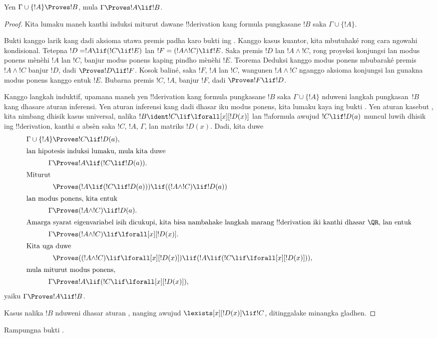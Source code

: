 \documentclass[../../../include/open-logic-section]{subfiles}
\begin{document}


\begin{thm}
 Yen $\Gamma \cup \{!A\} \Proves !B$,
mula $\Gamma \Proves !A \lif !B$.
\end{thm}

\begin{proof}
Kita lumaku maneh kanthi induksi miturut dawane !!{derivation} kang
formula pungkasane $!B$ saka $\Gamma \cup \{!A\}$.

Bukti kanggo larik kang dadi aksioma utawa premis padha karo bukti
ing . Kanggo kasus kuantor, kita
mbutuhaké rong cara ngowahi kondisional. Tetepna
$!D = !A\lif(!C\lif !E)$ lan $!F = (!A\land !C)\lif !E$.
Saka premis $!D$ lan $!A\land !C$, rong proyeksi
konjungsi lan modus ponens mènèhi $!A$ lan $!C$, banjur modus ponens
kaping pindho mènèhi $!E$. Teorema Deduksi kanggo modus ponens
mbubaraké premis $!A\land !C$ banjur $!D$, dadi $\Proves !D\lif !F$.
Kosok baliné, saka $!F$, $!A$ lan $!C$, wangunen $!A\land !C$ nganggo
aksioma konjungsi lan gunakna modus ponens kanggo entuk $!E$.
Bubarna premis $!C$, $!A$, banjur $!F$, dadi $\Proves !F\lif !D$.

Kanggo langkah induktif, upamana maneh yen !!{derivation} kang formula
pungkasane $!B$ saka $\Gamma \cup \{!A\}$ nduweni langkah
pungkasan~$!B$ kang dhasare aturan inferensi. Yen aturan inferensi
kang dadi dhasar iku modus ponens, kita lumaku kaya ing bukti
. Yen aturan kasebut \QR, kita
nimbang dhisik kasus universal, nalika $!B \ident !C \lif \lforall[x][!D(x)]$ lan !!a{formula}
awujud $!C \lif !D(a)$ muncul luwih dhisik ing !!{derivation}, kanthi
$a$ absèn saka $!C$, $!A$, $\Gamma$, lan matriks $!D(x)$. Dadi, kita duwe
\begin{align*}
  \Gamma \cup \{!A\} & \Proves !C \lif !D(a),\\
  \intertext{lan hipotesis induksi lumaku, mula kita duwe}
    \Gamma & \Proves !A \lif (!C \lif !D(a)).\\
  \intertext{Miturut}
  & \Proves (!A \lif (!C \lif !D(a))) \lif ((!A \land !C) \lif !D(a))\\
  \intertext{lan modus ponens, kita entuk}
  \Gamma & \Proves (!A \land !C) \lif !D(a).\\
  \intertext{Amarga syarat eigenvariabel isih dicukupi, kita bisa nambahake langkah marang !!{derivation} iki kanthi dhasar \QR, lan entuk}
    \Gamma & \Proves (!A \land !C) \lif \lforall[x][!D(x)].\\
    \intertext{Kita uga duwe}
    & \Proves ((!A \land !C) \lif \lforall[x][!D(x)]) \lif (!A \lif (!C \lif \lforall[x][!D(x)])),\\
    \intertext{mula miturut modus ponens,}
    \Gamma & \Proves !A \lif (!C \lif \lforall[x][!D(x)]),
\end{align*}
yaiku $\Gamma \Proves !A \lif !B$.

Kasus nalika $!B$ nduweni dhasar aturan \QR, nanging awujud
$\lexists[x][!D(x)] \lif !C$, ditinggalake minangka gladhen.
\end{proof}

\begin{prob}
  Rampungna bukti .
\end{prob}
\end{document}

